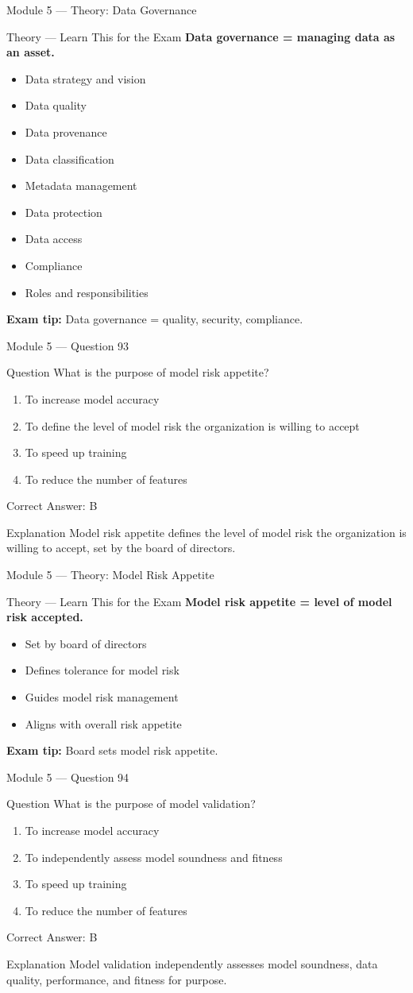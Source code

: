 \documentclass[aspectratio=169,10pt]{beamer}
\newcommand{\question}[1]{%
	\begin{block}{Question}
		#1
	\end{block}
}
\newcommand{\options}[4]{%
	\begin{enumerate}[label=\Alph*.,leftmargin=*]
		\item #1
		\item #2
		\item #3
		\item #4
	\end{enumerate}
}
\newcommand{\answerbox}[1]{%
	\begin{exampleblock}{Correct Answer: #1}
	\end{exampleblock}
}
\newcommand{\explain}[1]{%
	\begin{block}{Explanation}
		\small #1
	\end{block}
}
\newcommand{\theory}[1]{%
	\begin{block}{Theory --- Learn This for the Exam}
		\small #1
	\end{block}
}
\begin{document}
	\begin{frame}{Module 5 --- Theory: Data Governance}
		\theory{
			\textbf{Data governance = managing data as an asset.}
			\begin{itemize}
				\item Data strategy and vision
				\item Data quality
				\item Data provenance
				\item Data classification
				\item Metadata management
				\item Data protection
				\item Data access
				\item Compliance
				\item Roles and responsibilities
			\end{itemize}
			\textbf{Exam tip:} Data governance = quality, security, compliance.
		}
	\end{frame}
	
	\begin{frame}{Module 5 --- Question 93}
		\question{What is the purpose of model risk appetite?}
		\options{To increase model accuracy}{To define the level of model risk the organization is willing to accept}{To speed up training}{To reduce the number of features}
		\answerbox{B}
		\explain{Model risk appetite defines the level of model risk the organization is willing to accept, set by the board of directors.}
	\end{frame}
	
	\begin{frame}{Module 5 --- Theory: Model Risk Appetite}
		\theory{
			\textbf{Model risk appetite = level of model risk accepted.}
			\begin{itemize}
				\item Set by board of directors
				\item Defines tolerance for model risk
				\item Guides model risk management
				\item Aligns with overall risk appetite
			\end{itemize}
			\textbf{Exam tip:} Board sets model risk appetite.
		}
	\end{frame}
	
	\begin{frame}{Module 5 --- Question 94}
		\question{What is the purpose of model validation?}
		\options{To increase model accuracy}{To independently assess model soundness and fitness}{To speed up training}{To reduce the number of features}
		\answerbox{B}
		\explain{Model validation independently assesses model soundness, data quality, performance, and fitness for purpose.}
	\end{frame}
	
\end{document}
